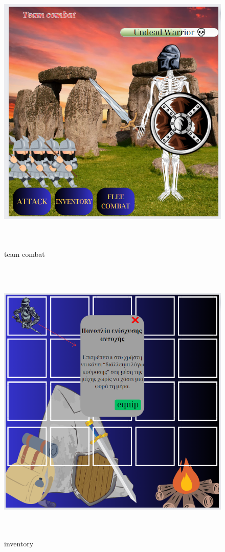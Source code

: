 \begin{figure}[!htb]
  \centering
    \centering
    \includegraphics[width=\textwidth,height=14cm]{mockup6.jpg}
    \caption{team combat}
    \label{}
\end{figure}
\begin{figure}[!htb]
  \centering
    \centering
    \includegraphics[width=\textwidth,height=14cm]{mockup7.jpg}
    \caption{inventory}
    \label{}
\end{figure}
